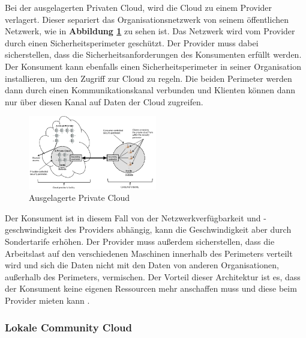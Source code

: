 Bei der ausgelagerten Privaten Cloud, wird die Cloud zu einem Provider verlagert. Dieser separiert das Organisationsnetzwerk
von seinem \glqq öffentlichen\grqq{} Netzwerk, wie in \textbf{Abbildung \ref{OutSourcedPrivateCloud}} zu sehen ist. Das Netzwerk wird vom Provider
durch einen Sicherheitsperimeter geschützt. Der Provider muss dabei sicherstellen, dass die Sicherheitsanforderungen des Konsumenten erfüllt werden. 
Der Konsument kann ebenfalls einen Sicherheitsperimeter in seiner Organisation installieren, um den Zugriff zur Cloud zu regeln.
Die beiden Perimeter werden dann durch einen Kommunikationskanal verbunden und Klienten können dann nur über diesen Kanal auf Daten der Cloud zugreifen.
\begin{figure}[h]
    \centering
	\includegraphics[width=0.5\textwidth]{Images/OutSourcedPrivateCloud}
	\caption{Ausgelagerte Private Cloud \cite{Badger}}
	\label{OutSourcedPrivateCloud}
\end{figure}
Der Konsument ist in diesem Fall von der Netzwerkverfügbarkeit und -geschwindigkeit des Providers abhängig, kann die Geschwindigkeit aber durch Sondertarife erhöhen.
Der Provider muss außerdem sicherstellen, dass die Arbeitslast auf den verschiedenen Maschinen innerhalb des Perimeters verteilt wird und sich die Daten 
nicht mit den Daten von anderen Organisationen, außerhalb des Perimeters, vermischen.
Der Vorteil dieser Architektur ist es, dass der Konsument keine eigenen Ressourcen mehr anschaffen muss und diese beim Provider mieten kann \cite{Badger}.

\subsubsection{Lokale Community Cloud}

